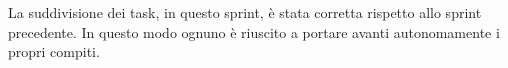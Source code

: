 La suddivisione dei task, in questo sprint, è stata corretta rispetto allo sprint precedente. In questo modo ognuno è riuscito a portare avanti autonomamente i propri compiti. 